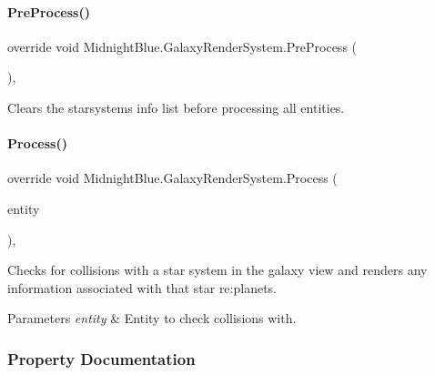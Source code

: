\paragraph{\texorpdfstring{Pre\+Process()}{PreProcess()}}
{\footnotesize\ttfamily override void Midnight\+Blue.\+Galaxy\+Render\+System.\+Pre\+Process (\begin{DoxyParamCaption}{ }\end{DoxyParamCaption})\hspace{0.3cm}{\ttfamily [inline]}, {\ttfamily [protected]}}



Clears the starsystems info list before processing all entities. 

\hypertarget{class_midnight_blue_1_1_galaxy_render_system_aabbf61a4bcfb7c026d2d0c9fbe90569f}{}\label{class_midnight_blue_1_1_galaxy_render_system_aabbf61a4bcfb7c026d2d0c9fbe90569f} 
\paragraph{\texorpdfstring{Process()}{Process()}}
{\footnotesize\ttfamily override void Midnight\+Blue.\+Galaxy\+Render\+System.\+Process (\begin{DoxyParamCaption}\item[{Entity}]{entity }\end{DoxyParamCaption})\hspace{0.3cm}{\ttfamily [inline]}, {\ttfamily [protected]}}



Checks for collisions with a star system in the galaxy view and renders any information associated with that star re\+:planets. 


\begin{DoxyParams}{Parameters}
{\em entity} & Entity to check collisions with.\\
\hline
\end{DoxyParams}


\subsubsection{Property Documentation}
\hypertarget{class_midnight_blue_1_1_galaxy_render_system_a2f252c64ec38b5bcf20c6b276fd5809b}{}\label{class_midnight_blue_1_1_galaxy_render_system_a2f252c64ec38b5bcf20c6b276fd5809b} 
